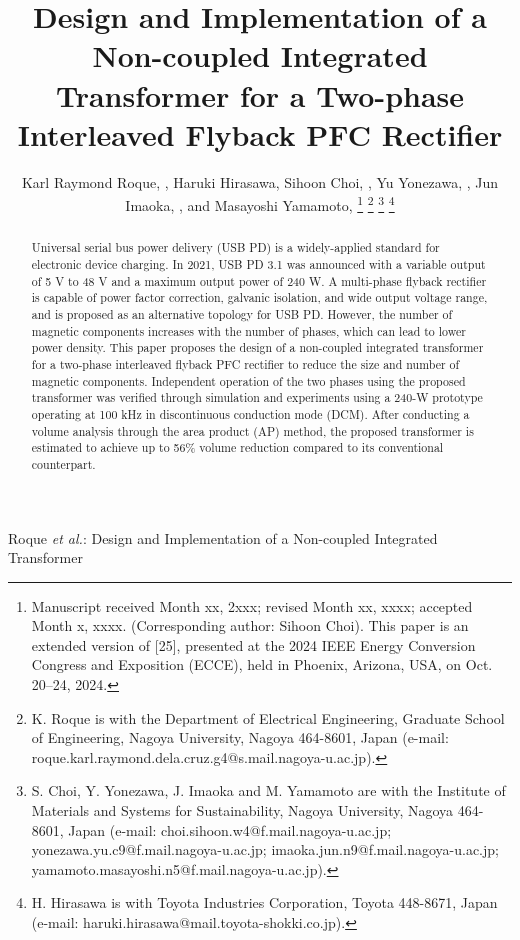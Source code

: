 \documentclass[lettersize,journal]{IEEEtran}
\begin{document}
\title{Design and Implementation of a Non-coupled Integrated Transformer for a Two-phase Interleaved Flyback PFC Rectifier}

\author{Karl Raymond Roque, , Haruki Hirasawa, Sihoon Choi, , Yu Yonezawa, , Jun Imaoka, , and Masayoshi Yamamoto, 
\thanks{Manuscript received Month xx, 2xxx; revised Month xx, xxxx; accepted Month x, xxxx. (Corresponding author: Sihoon Choi). This paper is an extended version of [25], presented at the 2024 IEEE Energy Conversion Congress and Exposition (ECCE), held in Phoenix, Arizona, USA, on Oct. 20–24, 2024.}
\thanks{K. Roque is with the Department of Electrical Engineering, Graduate School of Engineering, Nagoya University, Nagoya 464-8601, Japan (e-mail: roque.karl.raymond.dela.cruz.g4@s.mail.nagoya-u.ac.jp).}
\thanks{S. Choi, Y. Yonezawa, J. Imaoka and M. Yamamoto are with the Institute of Materials and Systems for Sustainability, Nagoya University, Nagoya 464-8601, Japan (e-mail: choi.sihoon.w4@f.mail.nagoya-u.ac.jp; yonezawa.yu.c9@f.mail.nagoya-u.ac.jp; imaoka.jun.n9@f.mail.nagoya-u.ac.jp; yamamoto.masayoshi.n5@f.mail.nagoya-u.ac.jp).}
\thanks{H. Hirasawa is with Toyota Industries Corporation, Toyota 448-8671, Japan (e-mail: haruki.hirasawa@mail.toyota-shokki.co.jp).}}

%
{Roque \MakeLowercase{\textit{et al.}}: Design and Implementation of a Non-coupled Integrated Transformer}

\maketitle

\begin{abstract}
Universal serial bus power delivery (USB PD) is a widely-applied standard for electronic device charging. In 2021, USB PD 3.1 was announced with a variable output of 5 V to 48 V and a maximum output power of 240 W. A multi-phase flyback rectifier is capable of power factor correction, galvanic isolation, and wide output voltage range, and is proposed as an alternative topology for USB PD. However, the number of magnetic components increases with the number of phases, which can lead to lower power density. This paper proposes the design of a non-coupled integrated transformer for a two-phase interleaved flyback PFC rectifier to reduce the size and number of magnetic components. Independent operation of the two phases using the proposed transformer was verified through simulation and experiments using a 240-W prototype operating at 100 kHz in discontinuous conduction mode (DCM). After conducting a volume analysis through the area product (AP) method, the proposed transformer is estimated to achieve up to 56\% volume reduction compared to its conventional counterpart.
\end{abstract}
\end{document}
